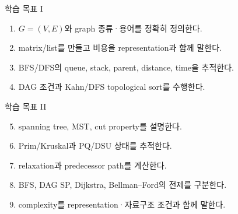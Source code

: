 \begin{frame}[plain]\vspace*{-8mm}\titlepage\end{frame}
\begin{frame}{학습 목표 I}
\small\begin{enumerate}\item $G=(V,E)$와 graph 종류·용어를 정확히 정의한다.\item matrix/list를 만들고 비용을 representation과 함께 말한다.\item BFS/DFS의 queue, stack, parent, distance, time을 추적한다.\item DAG 조건과 Kahn/DFS topological sort를 수행한다.\end{enumerate}
\end{frame}
\begin{frame}{학습 목표 II}
\small\begin{enumerate}\setcounter{enumi}{4}\item spanning tree, MST, cut property를 설명한다.\item Prim/Kruskal과 PQ/DSU 상태를 추적한다.\item relaxation과 predecessor path를 계산한다.\item BFS, DAG SP, Dijkstra, Bellman--Ford의 전제를 구분한다.\item complexity를 representation·자료구조 조건과 함께 말한다.\end{enumerate}
\end{frame}
